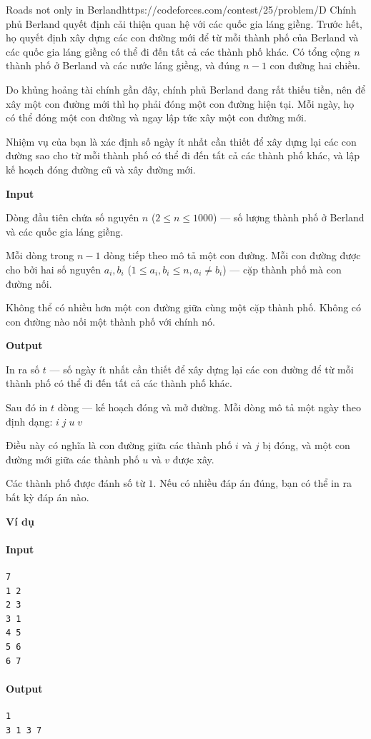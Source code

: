 \begin{baitap}{Roads not only in Berland}{https://codeforces.com/contest/25/problem/D}
Chính phủ Berland quyết định cải thiện quan hệ với các quốc gia láng giềng. 
Trước hết, họ quyết định xây dựng các con đường mới để từ mỗi thành phố của Berland và các quốc gia láng giềng có thể đi đến tất cả các thành phố khác. 
Có tổng cộng $n$ thành phố ở Berland và các nước láng giềng, và đúng $n - 1$ con đường hai chiều. 

Do khủng hoảng tài chính gần đây, chính phủ Berland đang rất thiếu tiền, 
nên để xây một con đường mới thì họ phải đóng một con đường hiện tại. 
Mỗi ngày, họ có thể đóng một con đường và ngay lập tức xây một con đường mới. 

Nhiệm vụ của bạn là xác định số ngày ít nhất cần thiết để xây dựng lại các con đường sao cho từ mỗi thành phố có thể đi đến tất cả các thành phố khác, 
và lập kế hoạch đóng đường cũ và xây đường mới.

\textbf{Input}

Dòng đầu tiên chứa số nguyên $n$ ($2 \le n \le 1000$) — số lượng thành phố ở Berland và các quốc gia láng giềng.  

Mỗi dòng trong $n - 1$ dòng tiếp theo mô tả một con đường.  
Mỗi con đường được cho bởi hai số nguyên $a_i, b_i$ ($1 \le a_i, b_i \le n, a_i \ne b_i$) — cặp thành phố mà con đường nối.  

Không thể có nhiều hơn một con đường giữa cùng một cặp thành phố.  
Không có con đường nào nối một thành phố với chính nó.

\textbf{Output}

In ra số $t$ — số ngày ít nhất cần thiết để xây dựng lại các con đường để từ mỗi thành phố có thể đi đến tất cả các thành phố khác.  

Sau đó in $t$ dòng — kế hoạch đóng và mở đường.  
Mỗi dòng mô tả một ngày theo định dạng: 
$
i \; j \; u \; v
$

Điều này có nghĩa là con đường giữa các thành phố $i$ và $j$ bị đóng, và một con đường mới giữa các thành phố $u$ và $v$ được xây.  

Các thành phố được đánh số từ $1$.  
Nếu có nhiều đáp án đúng, bạn có thể in ra bất kỳ đáp án nào.

\textbf{Ví dụ}
\paragraph{Input}
\begin{lstlisting}
7
1 2
2 3
3 1
4 5
5 6
6 7
\end{lstlisting}

\paragraph{Output}
\begin{lstlisting}
1
3 1 3 7
\end{lstlisting}
\end{baitap}

